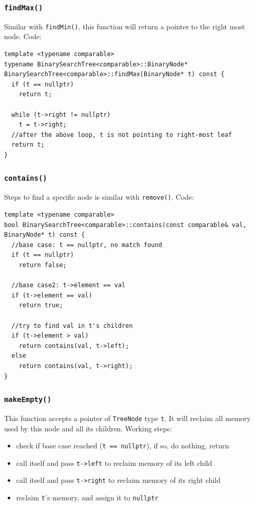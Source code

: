 \documentclass[12pt]{book}
\begin{document}
\subsubsection{\texttt{findMax()}}
\label{sec:org9c8bbd9}
Similar with \texttt{findMin()}, this function will return a pointer to the right most node. Code:
\begin{verbatim}
template <typename comparable>
typename BinarySearchTree<comparable>::BinaryNode* BinarySearchTree<comparable>::findMax(BinaryNode* t) const {
  if (t == nullptr)
    return t;

  while (t->right != nullptr)
    t = t->right;
  //after the above loop, t is not pointing to right-most leaf
  return t;   
}
\end{verbatim}

\subsubsection{\texttt{contains()}}
\label{sec:orgac20ff3}
Steps to find a specific node is similar with \texttt{remove()}. Code:
\begin{verbatim}
template <typename comparable>
bool BinarySearchTree<comparable>::contains(const comparable& val, BinaryNode* t) const {
  //base case: t == nullptr, no match found
  if (t == nullptr)
    return false;

  //base case2: t->element == val
  if (t->element == val)
    return true;

  //try to find val in t's children
  if (t->element > val)
    return contains(val, t->left);
  else 
    return contains(val, t->right);
}
\end{verbatim}

\subsubsection{\texttt{makeEmpty()}}
\label{sec:org598e249}
This function accepts a pointer of \texttt{TreeNode} type \texttt{t}. It will reclaim all memory used by this node and all its children. Working steps:
\begin{itemize}
\item check if base case reached (\texttt{t == nullptr}), if so, do nothing, return
\item call itself and pass \texttt{t->left} to reclaim memory of its left child
\item call itself and pass \texttt{t->right} to reclaim memory of its right child
\item reclaim \texttt{t}'s memory, and assign it to \texttt{nullptr}
\end{itemize}
\end{document}
